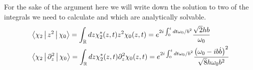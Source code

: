 For the sake of the argument here we will write down the solution to two of the integrals we need to calculate and which are analytically solvable.
\begin{align}
	  & \Braket{\chi_{2}|z^2|\chi_{0}} =
        \int_{\mathbb{R}}dz \chi_{2}^{*}(z,t) z^2 \chi_{0}(z,t) =
        e^{2i\int_{0}^{t}dt\omega_{0}/b^2 }\frac{\sqrt{2}h b   }{\omega_0}\\
	  & \Braket{\chi_{2}|\partial_z^2|\chi_{0}} =
        \int_{\mathbb{R}}dz \chi_{2}^{*}(z,t) \partial_z^2 \chi_{0}(z,t)=
        e^{2i\int_{0}^{t}dt\omega_{0}/b^2 }\frac{\left(\omega_0 - ib\dot{b}\right)^2}{ \sqrt{8} h\omega_0b^2 }
\end{align}
